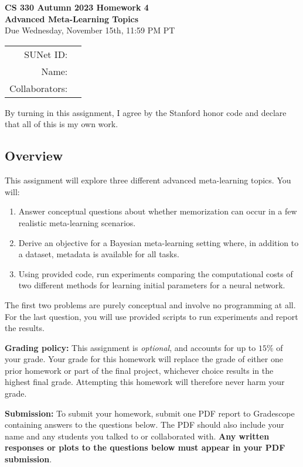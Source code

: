 \documentclass[12pt]{article}
\begin{document}
\begin{center}
{\Large \textbf{
    CS 330 Autumn 2023 Homework 4 \\ 
    Advanced Meta-Learning Topics} \\ 
}
\vspace{0.4cm}
{\large Due Wednesday, November 15th, 11:59 PM PT }

\begin{tabular}{rl}
SUNet ID: &  \\
Name: & \\
Collaborators: & 
\end{tabular}
\end{center}
By turning in this assignment, I agree by the Stanford honor code and declare that all of this is my own work.

\subsection*{Overview}
This assignment will explore three different advanced meta-learning topics.
You will:
\begin{enumerate}
    \item Answer conceptual questions about whether memorization can occur in a few realistic meta-learning scenarios.
    \item Derive an objective for a Bayesian meta-learning setting where, in addition to a dataset, metadata is available for all tasks.
    \item Using provided code, run experiments comparing the computational costs of two different methods for learning initial parameters for a neural network.
\end{enumerate}
The first two problems are purely conceptual and involve no programming at all.
For the last question, you will use provided scripts to run experiments and report the results.

\textbf{Grading policy:} This assignment is \textit{optional}, and accounts for up to $15\%$ of your grade. Your grade for this homework will replace the grade of either one prior homework or part of the final project, whichever choice results in the highest final grade. Attempting this homework will therefore never harm your grade.

\textbf{Submission:} To submit your homework, submit one PDF report to Gradescope containing answers to the questions below. The PDF should also include your name and any students you talked to or collaborated with.
\textbf{Any written responses or plots to the questions below must appear in your PDF submission}.
\end{document}
